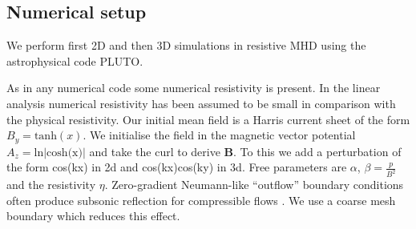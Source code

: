 \documentclass[square]{ws-procs11x85}
\begin{document}
\begin{multicols}{2}
\section{Numerical setup}
\label{Method}

We perform first 2D and then 3D simulations in resistive MHD using the
astrophysical code PLUTO.
% 
% 
% 
% 
% 
% 
% 
% 
% 
% 

As in any numerical code some numerical resistivity is present. In the linear
analysis numerical resistivity has been assumed to be small in comparison with
the physical resistivity.
Our initial mean field is a Harris current sheet of the form
$B_y=\mathrm{tanh}(x)$.
We initialise the field in the magnetic vector potential $A_z=\mathrm{ln}
|\mathrm{cosh(x})|$
and take the curl to derive $\mathbf{B}.$
To this we add a perturbation of the form cos(kx) in 2d and cos(kx)cos(ky) in
3d.
Free parameters are $\alpha$, $\beta=\frac{p}{B^2}$ and the resistivity $\eta$.
Zero-gradient Neumann-like ``outflow'' boundary conditions often produce
subsonic reflection for
compressible flows \cite{Roache,Colonius}. We use
a coarse mesh boundary which reduces this effect.



\end{multicols}
\end{document}
